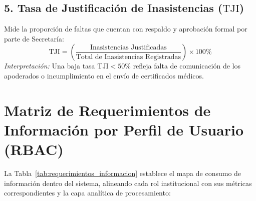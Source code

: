 \documentclass[12pt,a4paper,oneside]{report}
\begin{document}
    \subsection{5. Tasa de Justificación de Inasistencias ($\text{TJI}$)}
    Mide la proporción de faltas que cuentan con respaldo y aprobación formal por parte de Secretaría:
    \begin{equation}
    \text{TJI} = \left( \frac{\text{Inasistencias Justificadas}}{\text{Total de Inasistencias Registradas}} \right) \times 100\%
    \end{equation}
    \textit{Interpretación:} Una baja tasa $\text{TJI} < 50\%$ refleja falta de comunicación de los apoderados o incumplimiento en el envío de certificados médicos.

    \section{Matriz de Requerimientos de Información por Perfil de Usuario (RBAC)}

    La Tabla~\ref{tab:requerimientos_informacion} establece el mapa de consumo de información dentro del sistema, alineando cada rol institucional con sus métricas correspondientes y la capa analítica de procesamiento:
\end{document}
